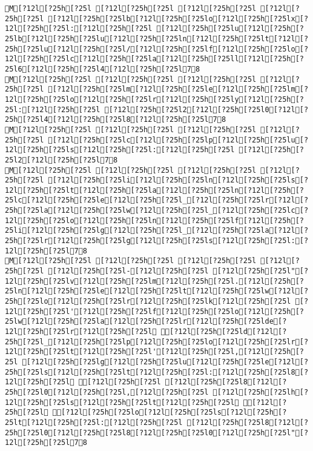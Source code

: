 \documentclass{scrartcl}
\begin{document}
\begin{Verbatim}
M[?12l[?25h[?25l [?12l[?25h[?25l [?12l[?25h[?25l [?12l[?25h[?25l [?12l[?25h[?25lb[?12l[?25h[?25lo[?12l[?25h[?25lx[?12l[?25h[?25l:[?12l[?25h[?25l [?12l[?25h[?25lu[?12l[?25h[?25lb[?12l[?25h[?25lu[?12l[?25h[?25ln[?12l[?25h[?25lt[?12l[?25h[?25lu[?12l[?25h[?25l/[?12l[?25h[?25lf[?12l[?25h[?25lo[?12l[?25h[?25lc[?12l[?25h[?25la[?12l[?25h[?25ll[?12l[?25h[?25l6[?12l[?25h[?25l4[?12l[?25h[?25l78
M[?12l[?25h[?25l [?12l[?25h[?25l [?12l[?25h[?25l [?12l[?25h[?25l [?12l[?25h[?25lm[?12l[?25h[?25le[?12l[?25h[?25lm[?12l[?25h[?25lo[?12l[?25h[?25lr[?12l[?25h[?25ly[?12l[?25h[?25l:[?12l[?25h[?25l [?12l[?25h[?25l2[?12l[?25h[?25l0[?12l[?25h[?25l4[?12l[?25h[?25l8[?12l[?25h[?25l78
M[?12l[?25h[?25l [?12l[?25h[?25l [?12l[?25h[?25l [?12l[?25h[?25l [?12l[?25h[?25lc[?12l[?25h[?25lp[?12l[?25h[?25lu[?12l[?25h[?25ls[?12l[?25h[?25l:[?12l[?25h[?25l [?12l[?25h[?25l2[?12l[?25h[?25l78
M[?12l[?25h[?25l [?12l[?25h[?25l [?12l[?25h[?25l [?12l[?25h[?25l [?12l[?25h[?25li[?12l[?25h[?25ln[?12l[?25h[?25ls[?12l[?25h[?25lt[?12l[?25h[?25la[?12l[?25h[?25ln[?12l[?25h[?25lc[?12l[?25h[?25le[?12l[?25h[?25l_[?12l[?25h[?25lr[?12l[?25h[?25la[?12l[?25h[?25lw[?12l[?25h[?25l_[?12l[?25h[?25lc[?12l[?25h[?25lo[?12l[?25h[?25ln[?12l[?25h[?25lf[?12l[?25h[?25li[?12l[?25h[?25lg[?12l[?25h[?25l_[?12l[?25h[?25la[?12l[?25h[?25lr[?12l[?25h[?25lg[?12l[?25h[?25ls[?12l[?25h[?25l:[?12l[?25h[?25l78
M[?12l[?25h[?25l [?12l[?25h[?25l [?12l[?25h[?25l [?12l[?25h[?25l [?12l[?25h[?25l-[?12l[?25h[?25l [?12l[?25h[?25l"[?12l[?25h[?25lv[?12l[?25h[?25lm[?12l[?25h[?25l.[?12l[?25h[?25ln[?12l[?25h[?25le[?12l[?25h[?25lt[?12l[?25h[?25lw[?12l[?25h[?25lo[?12l[?25h[?25lr[?12l[?25h[?25lk[?12l[?25h[?25l [?12l[?25h[?25l'[?12l[?25h[?25lf[?12l[?25h[?25lo[?12l[?25h[?25lw[?12l[?25h[?25la[?12l[?25h[?25lr[?12l[?25h[?25lde[?12l[?25h[?25lr[?12l[?25h[?25l [?12l[?25h[?25ld[?12l[?25h[?25l_[?12l[?25h[?25lp[?12l[?25h[?25lo[?12l[?25h[?25lr[?12l[?25h[?25lt[?12l[?25h[?25l'[?12l[?25h[?25l,[?12l[?25h[?25l [?12l[?25h[?25lg[?12l[?25h[?25lu[?12l[?25h[?25le[?12l[?25h[?25ls[?12l[?25h[?25lt[?12l[?25h[?25l:[?12l[?25h[?25l8[?12l[?25h[?25l [?12l[?25h[?25l [?12l[?25h[?25l8[?12l[?25h[?25l0[?12l[?25h[?25l,[?12l[?25h[?25l [?12l[?25h[?25lh[?12l[?25h[?25ls[?12l[?25h[?25lt[?12l[?25h[?25l [?12l[?25h[?25l [?12l[?25h[?25lo[?12l[?25h[?25ls[?12l[?25h[?25lt[?12l[?25h[?25l:[?12l[?25h[?25l [?12l[?25h[?25l8[?12l[?25h[?25l0[?12l[?25h[?25l8[?12l[?25h[?25l0[?12l[?25h[?25l"[?12l[?25h[?25l78

\end{Verbatim}
\end{document}

